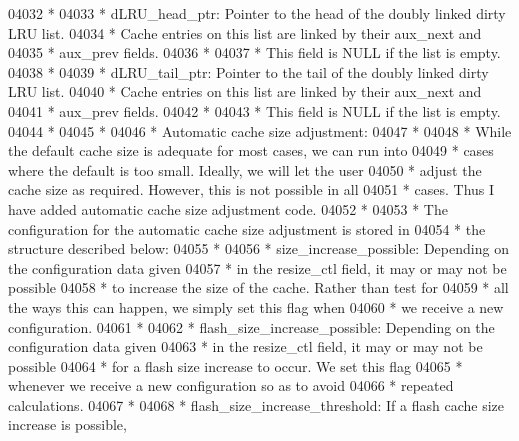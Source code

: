 \begin{DoxyCode}
04032 \textcolor{comment}{ *}
04033 \textcolor{comment}{ * dLRU\_head\_ptr:  Pointer to the head of the doubly linked dirty LRU list.}
04034 \textcolor{comment}{ *              Cache entries on this list are linked by their aux\_next and}
04035 \textcolor{comment}{ *              aux\_prev fields.}
04036 \textcolor{comment}{ *}
04037 \textcolor{comment}{ *              This field is NULL if the list is empty.}
04038 \textcolor{comment}{ *}
04039 \textcolor{comment}{ * dLRU\_tail\_ptr:  Pointer to the tail of the doubly linked dirty LRU list.}
04040 \textcolor{comment}{ *              Cache entries on this list are linked by their aux\_next and}
04041 \textcolor{comment}{ *              aux\_prev fields.}
04042 \textcolor{comment}{ *}
04043 \textcolor{comment}{ *              This field is NULL if the list is empty.}
04044 \textcolor{comment}{ *}
04045 \textcolor{comment}{ *}
04046 \textcolor{comment}{ * Automatic cache size adjustment:}
04047 \textcolor{comment}{ *}
04048 \textcolor{comment}{ * While the default cache size is adequate for most cases, we can run into}
04049 \textcolor{comment}{ * cases where the default is too small.  Ideally, we will let the user}
04050 \textcolor{comment}{ * adjust the cache size as required.  However, this is not possible in all}
04051 \textcolor{comment}{ * cases.  Thus I have added automatic cache size adjustment code.}
04052 \textcolor{comment}{ *}
04053 \textcolor{comment}{ * The configuration for the automatic cache size adjustment is stored in}
04054 \textcolor{comment}{ * the structure described below:}
04055 \textcolor{comment}{ *}
04056 \textcolor{comment}{ * size\_increase\_possible:  Depending on the configuration data given}
04057 \textcolor{comment}{ *      in the resize\_ctl field, it may or may not be possible}
04058 \textcolor{comment}{ *      to increase the size of the cache.  Rather than test for}
04059 \textcolor{comment}{ *      all the ways this can happen, we simply set this flag when}
04060 \textcolor{comment}{ *      we receive a new configuration.}
04061 \textcolor{comment}{ *}
04062 \textcolor{comment}{ * flash\_size\_increase\_possible: Depending on the configuration data given}
04063 \textcolor{comment}{ *              in the resize\_ctl field, it may or may not be possible}
04064 \textcolor{comment}{ *              for a flash size increase to occur.  We set this flag}
04065 \textcolor{comment}{ *              whenever we receive a new configuration so as to avoid}
04066 \textcolor{comment}{ *              repeated calculations.}
04067 \textcolor{comment}{ *}
04068 \textcolor{comment}{ * flash\_size\_increase\_threshold: If a flash cache size increase is possible,}

\end{DoxyCode}
